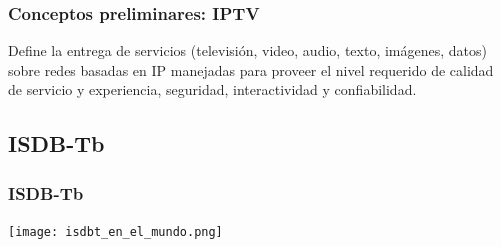\documentclass[a4paper,11pt]{beamer}
\begin{document}
		\begin{frame}
			\frametitle{Conceptos preliminares: IPTV}
			\begin{definition}
				Define la entrega de servicios (televisión, video, audio, texto, imágenes, datos) sobre redes basadas en IP manejadas para proveer el nivel requerido de calidad de servicio y experiencia, seguridad, interactividad y confiabilidad.
			\end{definition}

		\end{frame}


	\subsection{ISDB-Tb}
		\begin{frame}
			\frametitle{ISDB-Tb}
			\begin{center}
				\texttt{[image: isdbt\_en\_el\_mundo.png]}
			\end{center}
		\end{frame}
\end{document}
